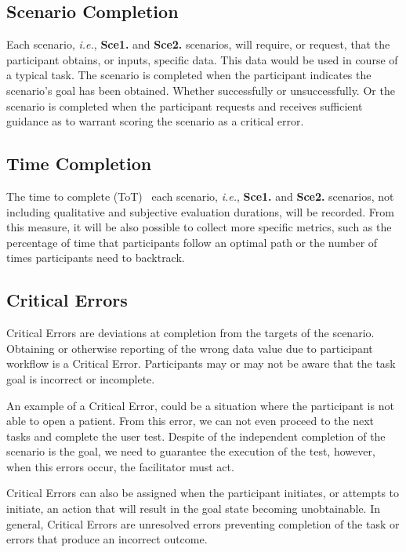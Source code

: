 \subsection{Scenario Completion}

Each scenario, {\it i.e.}, {\bf Sce1.} and {\bf Sce2.} scenarios, will require, or request, that the participant obtains, or inputs, specific data. This data would be used in course of a typical task. The scenario is completed when the participant indicates the scenario's goal has been obtained. Whether successfully or unsuccessfully. Or the scenario is completed when the participant requests and receives sufficient guidance as to warrant scoring the scenario as a critical error.

\subsection{Time Completion}

The time to complete (ToT)~\cite{delgado2017time, huang2018impact} each scenario, {\it i.e.}, {\bf Sce1.} and {\bf Sce2.} scenarios, not including qualitative and subjective evaluation durations, will be recorded. From this measure, it will be also possible to collect more specific metrics, such as the percentage of time that participants follow an optimal path or the number of times participants need to backtrack.

\subsection{Critical Errors}

Critical Errors are deviations at completion from the targets of the scenario. Obtaining or otherwise reporting of the wrong data value due to participant workflow is a Critical Error. Participants may or may not be aware that the task goal is incorrect or incomplete.

An example of a Critical Error, could be a situation where the participant is not able to open a patient. From this error, we can not even proceed to the next tasks and complete the user test. Despite of the independent completion of the scenario is the goal, we need to guarantee the execution of the test, however, when this errors occur, the facilitator must act.

Critical Errors can also be assigned when the participant initiates, or attempts to initiate, an action that will result in the goal state becoming unobtainable. In general, Critical Errors are unresolved errors preventing completion of the task or errors that produce an incorrect outcome.


